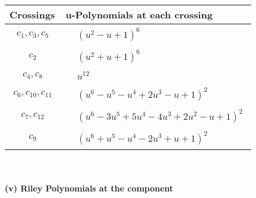 \documentclass[1p]{elsarticle_modified}
\theoremstyle{definition}
\begin{document}
\begin{tabular}{m{50pt}|m{274pt}}
Crossings & \hspace{64pt}u-Polynomials at each crossing \\
\hline $$\begin{aligned}c_{1},c_{3},c_{5}\end{aligned}$$&$\begin{aligned}
&(u^2- u+1)^6
\end{aligned}$\\
\hline $$\begin{aligned}c_{2}\end{aligned}$$&$\begin{aligned}
&(u^2+u+1)^6
\end{aligned}$\\
\hline $$\begin{aligned}c_{4},c_{8}\end{aligned}$$&$\begin{aligned}
&u^{12}
\end{aligned}$\\
\hline $$\begin{aligned}c_{6},c_{10},c_{11}\end{aligned}$$&$\begin{aligned}
&(u^6- u^5- u^4+2 u^3- u+1)^2
\end{aligned}$\\
\hline $$\begin{aligned}c_{7},c_{12}\end{aligned}$$&$\begin{aligned}
&(u^6-3 u^5+5 u^4-4 u^3+2 u^2- u+1)^2
\end{aligned}$\\
\hline $$\begin{aligned}c_{9}\end{aligned}$$&$\begin{aligned}
&(u^6+u^5- u^4-2 u^3+u+1)^2
\end{aligned}$\\
\hline
\end{tabular}\\~\\
\newpage\renewcommand{\arraystretch}{1}
\flushleft \textbf{(v) Riley Polynomials at the component}\newline \\
\end{document}
